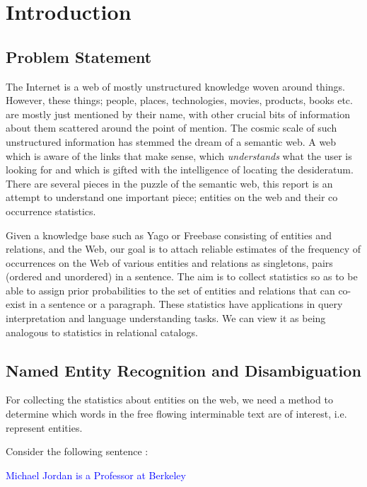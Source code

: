 \section{Introduction}
\subsection{Problem Statement}
The Internet is a web of mostly unstructured knowledge woven around things. However, these things; people, places, technologies, movies, products, books
etc. are mostly just mentioned by their name, with other crucial bits of information about them scattered around the point of mention. The cosmic scale of 
such unstructured information has stemmed the dream of a semantic web. A web which is aware of the links that make sense, which \emph{understands} what the 
user is looking for and which is gifted with the intelligence of locating the desideratum.
There are several pieces in the puzzle of the semantic web, this report is an attempt to understand one important piece; entities on the web and
their co occurrence statistics.

Given a knowledge base such as Yago or Freebase consisting of entities and relations, and the Web, our goal is 
to attach reliable estimates of the frequency of occurrences on the Web of various entities and relations as 
singletons, pairs (ordered and unordered) in a sentence.  The aim is to collect statistics so as to be able to assign prior probabilities to the set of 
entities and relations that can co-exist in a sentence or a paragraph. These statistics have applications in 
query interpretation and language understanding tasks.  
We can view it as being analogous to statistics in relational catalogs.

\subsection{Named Entity Recognition and Disambiguation}
For collecting the statistics about entities on the web, we need a method to determine which words in the 
free flowing interminable text are of interest, i.e. represent entities. 

Consider the following sentence : 

 \begin{center}
\textcolor{blue}{Michael Jordan is a Professor at Berkeley}
   \end{center}

